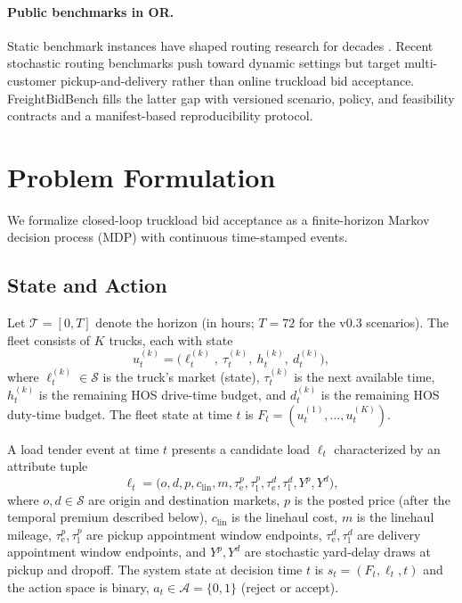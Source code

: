 \documentclass[11pt]{article}
\begin{document}
\paragraph{Public benchmarks in OR.}
Static benchmark instances have shaped routing research for decades
\citep{solomon1987vrptw,homberger2005vrptw,uchoa2017cvrp}. Recent stochastic
routing benchmarks \citep{heakl2025svrpbench} push toward dynamic settings
but target multi-customer pickup-and-delivery rather than online truckload
bid acceptance. FreightBidBench fills the latter gap with versioned
scenario, policy, and feasibility contracts and a manifest-based
reproducibility protocol.

\section{Problem Formulation}
\label{sec:problem}

We formalize closed-loop truckload bid acceptance as a finite-horizon
Markov decision process (MDP) with continuous time-stamped events.

\subsection{State and Action}

Let $\mathcal{T} = [0, T]$ denote the horizon (in hours; $T = 72$ for the
v0.3 scenarios). The fleet consists of $K$ trucks, each with state
\begin{equation}
  u^{(k)}_t = \bigl(\ell^{(k)}_t,\ \tau^{(k)}_t,\ h^{(k)}_t,\ d^{(k)}_t\bigr),
\end{equation}
where $\ell^{(k)}_t \in \mathcal{S}$ is the truck's market (state), $\tau^{(k)}_t$ is the
next available time, $h^{(k)}_t$ is the remaining HOS drive-time budget, and
$d^{(k)}_t$ is the remaining HOS duty-time budget. The fleet state at time
$t$ is $F_t = (u^{(1)}_t, \ldots, u^{(K)}_t)$.

A load tender event at time $t$ presents a candidate load $\ell_t$
characterized by an attribute tuple
\begin{equation}
  \ell_t = \bigl(o, d, p, c_{\mathrm{lin}}, m, \tau^{p}_{\mathrm{e}},
  \tau^{p}_{\mathrm{l}}, \tau^{d}_{\mathrm{e}}, \tau^{d}_{\mathrm{l}},
  Y^{p}, Y^{d}\bigr),
\end{equation}
where $o, d \in \mathcal{S}$ are origin and destination markets, $p$ is the
posted price (after the temporal premium described below), $c_{\mathrm{lin}}$ is the
linehaul cost, $m$ is the linehaul mileage, $\tau^{p}_{\mathrm{e}}, \tau^{p}_{\mathrm{l}}$ are
pickup appointment window endpoints, $\tau^{d}_{\mathrm{e}}, \tau^{d}_{\mathrm{l}}$ are delivery
appointment window endpoints, and $Y^{p}, Y^{d}$ are stochastic yard-delay
draws at pickup and dropoff. The system state at decision time $t$ is
$s_t = (F_t, \ell_t, t)$ and the action space is binary,
$a_t \in \mathcal{A} = \{0, 1\}$ (reject or accept).
\end{document}
